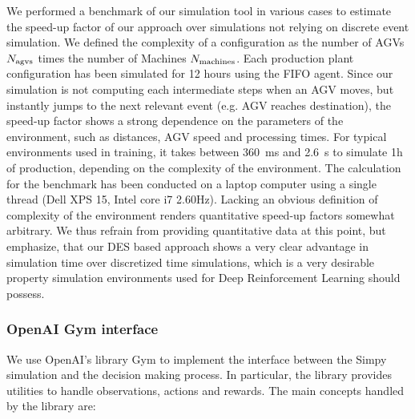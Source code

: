 \documentclass[sn-mathphys]{sn-jnl}
\begin{document}
We performed a benchmark of our simulation tool in various cases to estimate the speed-up factor of our approach over simulations not relying on discrete event simulation. We defined the complexity of a configuration as the number of AGVs $N_{\rm agvs}$ times the number of Machines $N_{\rm machines}$. Each production plant configuration has been simulated for 12 hours using the FIFO agent. Since our simulation is not computing each intermediate steps when an AGV moves, but instantly jumps to the next relevant event (e.g. AGV reaches destination), the speed-up factor shows a strong dependence on the parameters of the environment, such as distances, AGV speed and processing times. For typical environments used in training, it takes between 360~ms and 2.6~s to simulate 1h of production, depending on the complexity of the environment. The calculation for the benchmark has been conducted on a laptop computer using a single thread (Dell XPS 15, Intel core i7 2.60Hz). Lacking an obvious definition of complexity of the environment renders quantitative speed-up factors somewhat arbitrary. We thus refrain from providing quantitative data at this point, but emphasize, that our DES based approach shows a very clear advantage in simulation time over discretized time simulations, which is a very desirable property simulation environments used for Deep Reinforcement Learning should possess.  

\subsubsection{OpenAI Gym interface}

We use OpenAI’s library Gym \cite{brockman2016openai} to implement the interface between the Simpy simulation and the decision making process. In particular, the library provides utilities to handle observations, actions and rewards. The main concepts handled by the library are:
\end{document}

